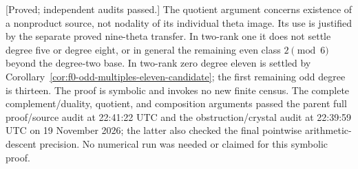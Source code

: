 \begin{remark}
\label{rem:nonordinary-arbitrary-odd-neighbor-scope-candidate}
\textup{[Proved; independent audits passed.]}
The quotient argument concerns existence of a nonproduct source,
not nodality of its individual theta image. Its use is justified
by the separate proved nine-theta transfer. In two-rank one it
does not settle degree five or degree eight, or in general the
remaining even class $2\pmod6$ beyond the degree-two base. In
two-rank zero degree eleven is settled by
Corollary~\ref{cor:f0-odd-multiples-eleven-candidate}; the first
remaining odd degree is thirteen.
The proof is symbolic and invokes no new finite census. The complete complement/duality, quotient, and composition
arguments passed the parent full proof/source audit at
22:41:22 UTC and the obstruction/crystal audit at 22:39:59 UTC
on 19 November 2026; the latter also checked the final
pointwise arithmetic-descent precision. No numerical run
was needed or claimed for this symbolic proof.
\end{remark}
